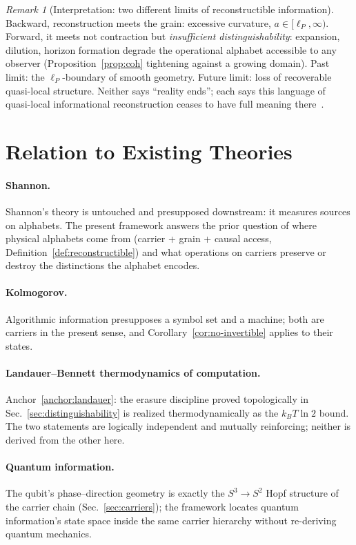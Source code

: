 \documentclass[11pt,a4paper]{article}
\theoremstyle{definition}
\theoremstyle{remark}
\newtheorem{remark}[theorem]{Remark}
\newcommand{\Stwo}{S^{2}}
\newcommand{\Sthree}{S^{3}}
\newcommand{\lP}{\ell_{P}}
\begin{document}
\begin{remark}[Interpretation: two different limits of reconstructible information]
Backward, reconstruction meets the grain: excessive curvature, $a\in[\lP,\infty)$.  Forward, it
meets not contraction but \emph{insufficient distinguishability}: expansion, dilution, horizon
formation degrade the operational alphabet accessible to any observer
(Proposition~\ref{prop:coh} tightening against a growing domain).  Past limit: the $\lP$-boundary
of smooth geometry.  Future limit: loss of recoverable quasi-local structure.  Neither says
``reality ends''; each says this language of quasi-local informational reconstruction ceases to
have full meaning there~\cite{BP2026ricci}.
\end{remark}

\section{Relation to Existing Theories}
\label{sec:relation}

\paragraph{Shannon.}  Shannon's theory is untouched and presupposed downstream: it measures
sources on alphabets.  The present framework answers the prior question of where physical
alphabets come from (carrier + grain + causal access, Definition~\ref{def:reconstructible}) and
what operations on carriers preserve or destroy the distinctions the alphabet encodes.

\paragraph{Kolmogorov.}  Algorithmic information presupposes a symbol set and a machine; both
are carriers in the present sense, and Corollary~\ref{cor:no-invertible} applies to their
states.

\paragraph{Landauer--Bennett thermodynamics of computation.}  Anchor~\ref{anchor:landauer}: the
erasure discipline proved topologically in Sec.~\ref{sec:distinguishability} is realized
thermodynamically as the $k_{B}T\ln2$ bound.  The two statements are logically independent and
mutually reinforcing; neither is derived from the other here.

\paragraph{Quantum information.}  The qubit's phase--direction geometry is exactly the
$\Sthree\to\Stwo$ Hopf structure of the carrier chain (Sec.~\ref{sec:carriers}); the framework
locates quantum information's state space inside the same carrier hierarchy without re-deriving
quantum mechanics.
\end{document}
